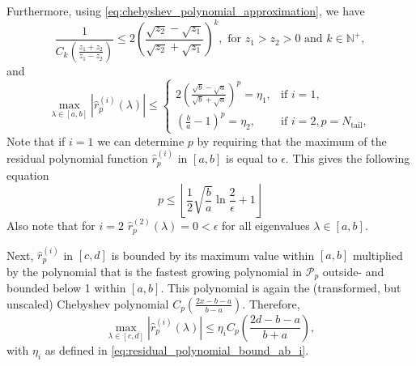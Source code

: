 Furthermore, using \cref{eq:chebyshev_polynomial_approximation}, we have
\begin{equation}
    \frac{1}{C_{k}\left(\frac{z_1 + z_2}{z_1 - z_2}\right)} \leq 2 \left(\frac{\sqrt{z_2} - \sqrt{z_1}}{\sqrt{z_2} + \sqrt{z_1}}\right)^k, \text{ for } z_1 > z_2 > 0 \text{ and } k \in \mathbb{N}^+,
    \label{eq:chebyshev_polynomial_bound}
\end{equation}
and
\begin{equation}
    \max_{\lambda \in [a,b]} |\hat{r}^{(i)}_p(\lambda)| \leq
    \begin{cases}
        2\left(\frac{\sqrt{b}-\sqrt{a}}{\sqrt{b}+\sqrt{a}}\right)^p=\eta_1 , & \text{if } i = 1,                      \\
        \left(\frac{b}{a}-1\right)^p=\eta_2                                , & \text{if } i = 2, p = N_{\text{tail}},
    \end{cases}
    \label{eq:residual_polynomial_bound_ab_i}
\end{equation}
Note that if $i=1$ we can determine $p$ by requiring that the maximum of the residual polynomial function $\hat{r}^{(i)}_p$ in $[a,b]$ is equal to $\epsilon$. This gives the following equation
\begin{equation}
    p \leq \left\lfloor\frac{1}{2}\sqrt{\frac{b}{a}}\ln{\frac{2}{\epsilon}} + 1\right\rfloor
    \label{eq:chebyshev_degree_p}
\end{equation}
Also note that for $i=2$ $\hat{r}^{(2)}_p(\lambda) = 0 < \epsilon$ for all eigenvalues $\lambda \in [a,b]$.

Next, $\hat{r}^{(i)}_p$ in $[c,d]$ is bounded by its maximum value within $[a,b]$ multiplied by the polynomial that is the fastest growing polynomial in $\mathcal{P}_{p}$ outside- and bounded below 1 within $[a,b]$. This polynomial is again the (transformed, but unscaled) Chebyshev polynomial $C_{p}\left(\frac{2x - b - a}{b - a}\right)$. Therefore,
\begin{equation*}
    \max_{\lambda \in [c,d]} |\hat{r}^{(i)}_p(\lambda)| \leq \eta_i C_{p}\left(\frac{2d - b - a}{b + a}\right),
\end{equation*}
with $\eta_i$ as defined in \cref{eq:residual_polynomial_bound_ab_i}.

